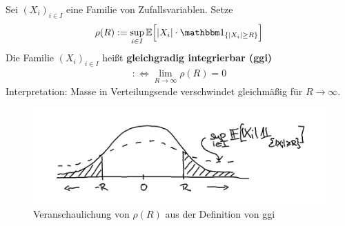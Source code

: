 \begin{defi}
Sei $(X_i)_{i\in I}$ eine Familie von Zufallsvariablen. Setze
\begin{align*}
\rho(R):=\sup\limits_{i\in I}\E\Big[|X_i|\cdot\indi_{\lbrace |X_i|\geq R\rbrace}\Big]
\end{align*}
Die Familie $(X_i)_{i\in I}$ heißt \textbf{gleichgradig integrierbar (ggi)}
\begin{align*}
:\Longleftrightarrow\lim\limits_{R\to\infty}\rho(R)=0
\end{align*}
Interpretation: Masse in Verteilungsende verschwindet gleichmäßig für $R\to\infty$.
\begin{figure}[h!]
	\begin{center}
		\includegraphics[width=\textwidth]{pics/Sketch3.png}
		\caption{Veranschaulichung von $\rho(R)$ aus der Definition von ggi}
		\label{AbbRhoGGI}
	\end{center}
\end{figure}
\end{defi}


